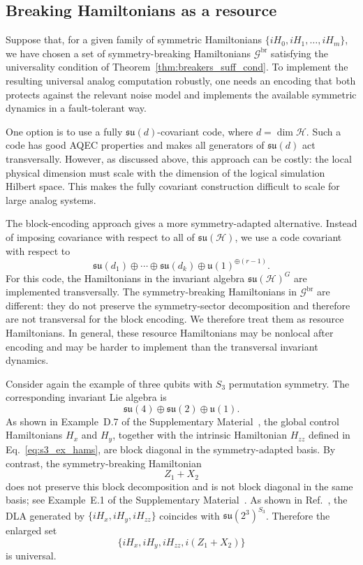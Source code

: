 \documentclass[10pt,twocolumn,superscriptaddress,aps,amsmath,amssymb,citeautoscript,floatfix,prx,longbibliography]{revtex4-2}
\newcounter{alg}
\theoremstyle{plain}
\theoremstyle{plain}
\theoremstyle{plain}
\theoremstyle{plain}
\theoremstyle{plain}
\theoremstyle{plain}
\begin{document}
\subsection{Breaking Hamiltonians as a resource}\label{subsec:main_H_br_resource}

Suppose that, for a given family of symmetric Hamiltonians $\{iH_0,iH_1,\ldots,iH_m\}$, we have chosen a set of symmetry-breaking Hamiltonians $\mathcal G^{\mathrm{br}}$ satisfying the universality condition of Theorem~\ref{thm:breakers_suff_cond}. To implement the resulting universal analog computation robustly, one needs an encoding that both protects against the relevant noise model and implements the available symmetric dynamics in a fault-tolerant way.

One option is to use a fully $\mathfrak{su}(d)$-covariant code, where $d=\dim\mathcal H$. Such a code has good AQEC properties and makes all generators of $\mathfrak{su}(d)$ act transversally. However, as discussed above, this approach can be costly: the local physical dimension must scale with the dimension of the logical simulation Hilbert space. This makes the fully covariant construction difficult to scale for large analog systems.

The block-encoding approach gives a more symmetry-adapted alternative. Instead of imposing covariance with respect to all of $\mathfrak{su}(\mathcal H)$, we use a code covariant with respect to
$$
    \mathfrak{su}(d_1)
    \oplus
    \cdots
    \oplus
    \mathfrak{su}(d_k)
    \oplus
    \mathfrak{u}(1)^{\oplus(r-1)} .
$$
For this code, the Hamiltonians in the invariant algebra $\mathfrak{su}(\mathcal H)^G$ are implemented transversally. The symmetry-breaking Hamiltonians in $\mathcal G^{\mathrm{br}}$ are different: they do not preserve the symmetry-sector decomposition and therefore are not transversal for the block encoding. We therefore treat them as resource Hamiltonians. In general, these resource Hamiltonians may be nonlocal after encoding and may be harder to implement than the transversal invariant dynamics.

Consider again the example of three qubits with $S_3$ permutation symmetry. The corresponding invariant Lie algebra is
$$
    \mathfrak{su}(4)
    \oplus
    \mathfrak{su}(2)
    \oplus
    \mathfrak{u}(1).
$$
As shown in Example~D.7 of the Supplementary Material~\cite{SuppMat}, the global control Hamiltonians $H_x$ and $H_y$, together with the intrinsic Hamiltonian $H_{zz}$ defined in Eq.~\eqref{eq:s3_ex_hams}, are block diagonal in the symmetry-adapted basis. By contrast, the symmetry-breaking Hamiltonian
$$
    Z_1+X_2
$$
does not preserve this block decomposition and is not block diagonal in the same basis; see Example~E.1 of the Supplementary Material~\cite{SuppMat}. As shown in Ref.~\cite{Albertini2018}, the DLA generated by $\{iH_x,iH_y,iH_{zz}\}$ coincides with $\mathfrak{su}(2^3)^{S_3}$. Therefore the enlarged set
$$
    \{iH_x,iH_y,iH_{zz},i(Z_1+X_2)\}
$$
is universal.
\end{document}
